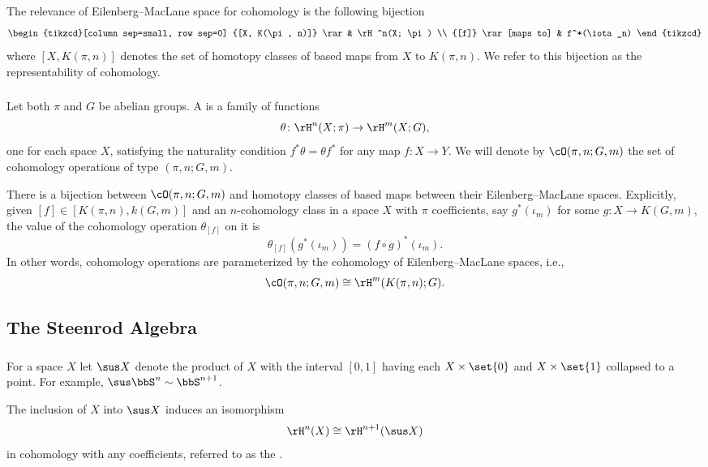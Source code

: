 The relevance of Eilenberg--MacLane space for cohomology is the following bijection
\[
\begin{tikzcd}[column sep=small, row sep=0]
	{[X, K(\pi, n)]} \rar & \rH^n(X; \pi) \\
	{[f]} \rar[maps to] & f^*(\iota_n)
\end{tikzcd}
\]
where $[X, K(\pi, n)]$ denotes the set of homotopy classes of based maps from $X$ to $K(\pi, n)$.
We refer to this bijection as the representability of cohomology.

\subsubsection{} Let both $\pi$ and $G$ be abelian groups.
A  is a family of functions
\[
\theta \colon \rH^n(X; \pi) \rightarrow \rH^m(X; G),
\]
one for each space $X$, satisfying the naturality condition $f^* \theta = \theta f^*$ for any map $f \colon X \rightarrow Y$.
We will denote by $\cO(\pi, n; G,m)$ the set of cohomology operations of type $(\pi, n; G,m)$.

There is a bijection between $\cO(\pi, n; G,m)$ and homotopy classes of based maps between their Eilenberg--MacLane spaces.
Explicitly, given $[f] \in [K(\pi,n), k(G,m)]$ and an $n$-cohomology class in a space $X$ with $\pi$ coefficients, say $g^*(\iota_m)$ for some $g \colon X \to K(G, m)$, the value of the cohomology operation $\theta_{[f]}$ on it is
\[
\theta_{[f]}(g^*(\iota_m)) = (f \circ g)^*(\iota_m).
\]
In other words, cohomology operations are parameterized by the cohomology of Eilenberg--MacLane spaces, i.e.,
\[
\cO(\pi, n; G,m) \cong \rH^m(K(\pi,n); G).
\]

\subsection{The Steenrod Algebra}\label{ss:steenrod}

\subsubsection{} For a space $X$ let $\sus X$ denote the product of $X$ with the interval $[0,1]$ having each $X \times \set{0}$ and $X \times \set{1}$ collapsed to a point.
For example, $\sus \bbS^n \sim \bbS^{n+1}$.

The inclusion of $X$ into $\sus X$ induces an isomorphism
\[
\rH^n(X) \cong \rH^{n+1}(\sus X)
\]
in cohomology with any coefficients, referred to as the .

